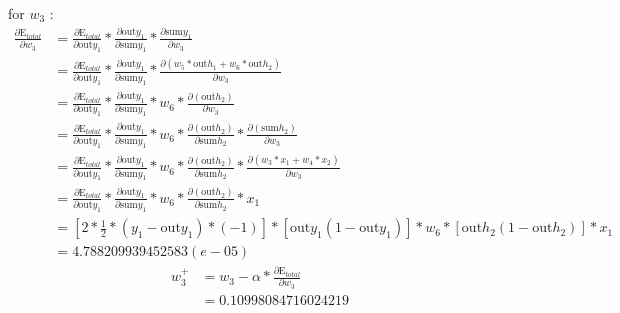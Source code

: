 \documentclass[a4paper, article, oneside, USenglish, IN5460]{memoir}
\begin{document}
{\newline
for $w_3$ :
\begin{equation}
\begin{aligned}
\frac{\partial \text{E}_{total}  }{\partial w_3} &= \frac{\partial \text{E}_{total}}{\partial \text{out}y_1} *\frac{\partial  \text{out}y_1}{\partial \text{sum}y_1}*\frac{\partial \text{sum}y_1}{\partial  w_3} \\
&= \frac{\partial \text{E}_{total}}{\partial \text{out}y_1} *\frac{\partial  \text{out}y_1}{\partial \text{sum}y_1}*\frac{\partial ( w_5*\text{out}h_1 + w_6*\text{out}h_2 )} {\partial w_3} \\
&= \frac{\partial \text{E}_{total}}{\partial \text{out}y_1} * \frac{\partial \text{out}y_1}{\partial \text{sum}y_1} *{w_6}* \frac{\partial ( \text{out}h_2 )} {\partial w_3}\\
&= \frac{\partial \text{E}_{total}}{\partial \text{out}y_1} * \frac{\partial \text{out}y_1}{\partial \text{sum}y_1} *{w_6}* \frac{\partial ( \text{out}h_2 )}{\partial \text{sum}h_2} * \frac{\partial ( \text{sum}h_2)}{\partial w_3}\\
&= \frac{\partial \text{E}_{total}}{\partial \text{out}y_1} * \frac{\partial \text{out}y_1}{\partial \text{sum}y_1} *{w_6}* \frac{\partial ( \text{out}h_2 )}{\partial \text{sum}h_2} * \frac{\partial ( w_3*x_1 + w_4*x_2)}{\partial w_3}\\
&= \frac{\partial \text{E}_{total}}{\partial \text{out}y_1} * \frac{\partial \text{out}y_1}{\partial \text{sum}y_1} *{w_6}* \frac{\partial ( \text{out}h_2 )}{\partial \text{sum}h_2} *  {x_1}\\
&= [2*\frac{1}{2}*(y_1 -\text{out}y_1)*(-1)] * [\text{out}y_1(1-\text{out}y_1)] *{w_6}* [\text{out}h_2 (1-\text{out}h_2)]*  {x_1}\\
& = 4.788209939452583(e-05)
\end{aligned}
\end{equation}
\begin{equation}
\begin{aligned}
w^+_3 &= w_3 - \alpha * \frac{\partial \text{E}_{total}  }{\partial w_3} \\
& = 0.10998084716024219
\end{aligned}
\end{equation}

}
\end{document}
